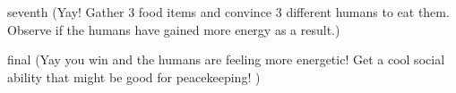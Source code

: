 \documentclass[notebook]{elementals} %
\begin{document}
\begin{page}{seventh}
(Yay!  Gather 3 food items and convince 3 different humans to eat them.  Observe if the humans have gained more energy as a result.)
\end{page}

\begin{page}{final}
(Yay you win and the humans are feeling more energetic!  Get a cool social ability that might be good for peacekeeping! )
\end{page}

\endnotebook
\end{document}
